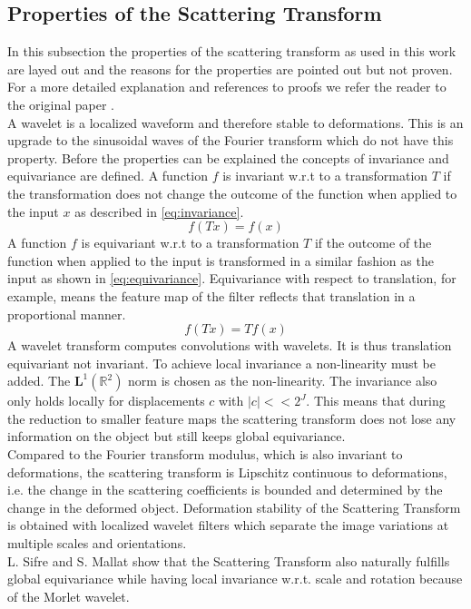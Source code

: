 \subsection{Properties of the Scattering Transform}
\label{subsec:properties}


In this subsection the properties of the scattering transform as used in this work are layed out and the reasons for the properties are pointed out but not proven. For a more detailed explanation and references to proofs we refer the reader to the original paper \cite{scatteringTransform2012}. \\
A wavelet is a localized waveform and therefore stable to deformations. This is an upgrade to the sinusoidal waves of the Fourier transform which do not have this property. Before the properties can be explained the concepts of invariance and equivariance are defined. 
A function $f$ is invariant w.r.t to a transformation $T$ if the transformation does not change the outcome of the function when applied to the input $x$ as described in \ref{eq:invariance}.
\begin{equation}
f(Tx) = f(x)
\label{eq:invariance}
\end{equation}
A function $f$ is equivariant w.r.t to a transformation $T$ if the outcome of the function when applied to the input is transformed in a similar fashion as the input as shown in \ref{eq:equivariance}. Equivariance with respect to translation, for example, means the feature map of the filter reflects that translation in a proportional manner.
\begin{equation}
f(Tx) = Tf(x)
\label{eq:equivariance}
\end{equation}
A wavelet transform computes convolutions with wavelets. It is thus translation equivariant not invariant. To achieve local invariance a non-linearity must be added. The $\textbf{L}^1(\mathbb{R}^2)$ norm is chosen as the non-linearity. 
The invariance also only holds locally for displacements $c$ with $|c| << 2^J$. This means that during the reduction to smaller feature maps the scattering transform does not lose any information on the object but still keeps global equivariance. \\
Compared to the Fourier transform modulus, which is also invariant to deformations, the scattering transform is Lipschitz continuous to deformations, i.e. the change in the scattering coefficients is bounded and determined by the change in the deformed object. Deformation  stability of the Scattering Transform is  obtained  with  localized wavelet filters which separate the image variations at multiple scales and orientations. \\
L. Sifre and S. Mallat  \cite{RotationScalingDeformationSifre2013} show that the Scattering Transform also naturally fulfills global equivariance while having local invariance w.r.t. scale and rotation because of the Morlet wavelet.

